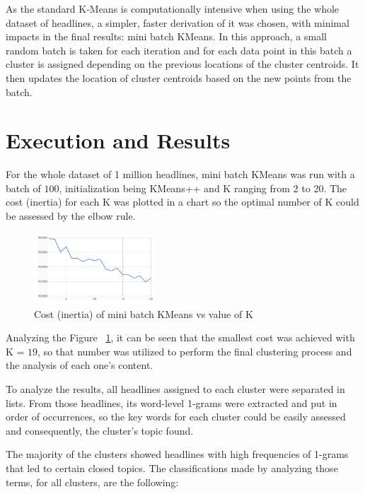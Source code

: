 \documentclass[10pt,twocolumn,letterpaper]{article}
\begin{document}
As the standard K-Means is computationally intensive when using the whole dataset of headlines,  a simpler, faster derivation of it was chosen, with minimal impacts in the final results: mini batch KMeans. In this approach, a small random batch is taken for each iteration and for each data point in this batch a cluster is assigned  depending on the previous locations of the cluster centroids. It then updates the location of cluster centroids based on the new points from the batch. 

\section{Execution and Results}

For the whole dataset of 1 million headlines, mini batch KMeans was run with a batch of $100$, initialization being KMeans++ and K ranging from 2 to 20. The cost (inertia) for each K was plotted in a chart so the optimal number of K could be assessed by the elbow rule.

\begin{figure}[H]
\begin{center}
	\includegraphics[width=0.4\textwidth]{pics/graph_inertia_all}
	\caption{Cost (inertia) of mini batch KMeans vs value of K\label{fig:graph_inertia_all}}   
\end{center} 
\end{figure}   

Analyzing the Figure ~\ref{fig:graph_inertia_all}, it can be seen that the smallest cost was achieved with K = $19$, so that number was utilized to perform the final clustering process and the analysis of each one's content.

To analyze the results, all headlines assigned to each cluster were separated in lists. From those headlines, its word-level 1-grams were extracted and put in order of occurrences, so the key words for each cluster could be easily assessed and consequently, the cluster's topic found.

The majority of the clusters showed headlines with high frequencies of 1-grams that led to certain closed topics. The classifications made by analyzing those terms, for all clusters, are the following:
\end{document}
